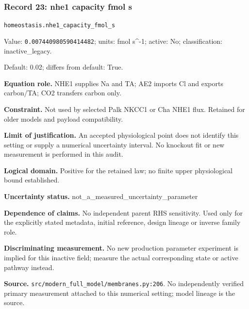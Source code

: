 \subsubsection*{Record 23: nhe1 capacity fmol s}
{\small \nolinkurl{homeostasis.nhe1_capacity_fmol_s}\par

Value: \texttt{0.007440980590414482}; units: fmol s\textasciicircum{}-1; active: No; classification: inactive\_legacy.\par

Default: 0.02; differs from default: True.\par

\textbf{Equation role.} NHE1 supplies Na and TA; AE2 imports Cl and exports carbon/TA; CO2 transfers carbon only.\par

\textbf{Constraint.} Not used by selected Palk NKCC1 or Cha NHE1 flux. Retained for older models and payload compatibility.\par

\textbf{Limit of justification.} An accepted physiological point does not identify this setting or supply a numerical uncertainty interval. No knockout fit or new measurement is performed in this audit.\par

\textbf{Logical domain.} Positive for the retained law; no finite upper physiological bound established.\par

\textbf{Uncertainty status.} not\_a\_measured\_uncertainty\_parameter\par

\textbf{Dependence of claims.} No independent parent RHS sensitivity. Used only for the explicitly stated metadata, initial reference, design lineage or inverse family role.\par

\textbf{Discriminating measurement.} No new production parameter experiment is implied for this inactive field; measure the actual corresponding state or active pathway instead.\par

\textbf{Source.} \nolinkurl{src/modern_full_model/membranes.py:206}. No independently verified primary measurement attached to this numerical setting; model lineage is the source.\par}

